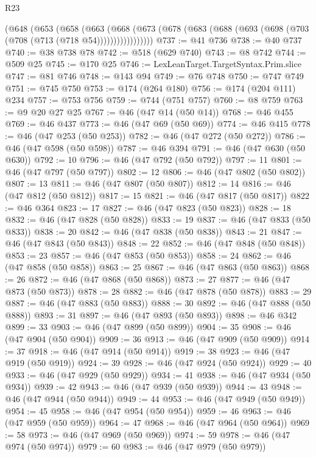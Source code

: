 \begin{lexlean}{R23}
\begin{coremodule}
        (@648
          (@653
            (@658
              (@663
                (@668
                  (@673 (@678 (@683 (@688 (@693 (@698 (@703 (@708 (@713 (@718 @54)))))))))))))))))
@737 := @41 @736
@738 := @40 @737
@740 := @38 @738 @78
@742 := @518 (@629 @740)
@743 := @8 @742
@744 := @509 @25
@745 := @170 @25
@746 := LexLeanTarget.TargetSyntax.Prim.slice
@747 := @81 @746
@748 := @143 @94
@749 := @76 @748
@750 := @747 @749
@751 := @745 @750
@753 := @174 (@264 @180)
@756 := @174 (@204 @111) @234
@757 := @753 @756
@759 := @744 (@751 @757)
@760 := @8 @759
@763 := @9 @20 @27 @25
@767 := @46 (@47 @14 (@50 @14))
@768 := @46 @455
@769 := @46 @437
@773 := @46 (@47 @69 (@50 @69))
@774 := @46 @415
@778 := @46 (@47 @253 (@50 @253))
@782 := @46 (@47 @272 (@50 @272))
@786 := @46 (@47 @598 (@50 @598))
@787 := @46 @394
@791 := @46 (@47 @630 (@50 @630))
@792 := 10
@796 := @46 (@47 @792 (@50 @792))
@797 := 11
@801 := @46 (@47 @797 (@50 @797))
@802 := 12
@806 := @46 (@47 @802 (@50 @802))
@807 := 13
@811 := @46 (@47 @807 (@50 @807))
@812 := 14
@816 := @46 (@47 @812 (@50 @812))
@817 := 15
@821 := @46 (@47 @817 (@50 @817))
@822 := @46 @364
@823 := 17
@827 := @46 (@47 @823 (@50 @823))
@828 := 18
@832 := @46 (@47 @828 (@50 @828))
@833 := 19
@837 := @46 (@47 @833 (@50 @833))
@838 := 20
@842 := @46 (@47 @838 (@50 @838))
@843 := 21
@847 := @46 (@47 @843 (@50 @843))
@848 := 22
@852 := @46 (@47 @848 (@50 @848))
@853 := 23
@857 := @46 (@47 @853 (@50 @853))
@858 := 24
@862 := @46 (@47 @858 (@50 @858))
@863 := 25
@867 := @46 (@47 @863 (@50 @863))
@868 := 26
@872 := @46 (@47 @868 (@50 @868))
@873 := 27
@877 := @46 (@47 @873 (@50 @873))
@878 := 28
@882 := @46 (@47 @878 (@50 @878))
@883 := 29
@887 := @46 (@47 @883 (@50 @883))
@888 := 30
@892 := @46 (@47 @888 (@50 @888))
@893 := 31
@897 := @46 (@47 @893 (@50 @893))
@898 := @46 @342
@899 := 33
@903 := @46 (@47 @899 (@50 @899))
@904 := 35
@908 := @46 (@47 @904 (@50 @904))
@909 := 36
@913 := @46 (@47 @909 (@50 @909))
@914 := 37
@918 := @46 (@47 @914 (@50 @914))
@919 := 38
@923 := @46 (@47 @919 (@50 @919))
@924 := 39
@928 := @46 (@47 @924 (@50 @924))
@929 := 40
@933 := @46 (@47 @929 (@50 @929))
@934 := 41
@938 := @46 (@47 @934 (@50 @934))
@939 := 42
@943 := @46 (@47 @939 (@50 @939))
@944 := 43
@948 := @46 (@47 @944 (@50 @944))
@949 := 44
@953 := @46 (@47 @949 (@50 @949))
@954 := 45
@958 := @46 (@47 @954 (@50 @954))
@959 := 46
@963 := @46 (@47 @959 (@50 @959))
@964 := 47
@968 := @46 (@47 @964 (@50 @964))
@969 := 58
@973 := @46 (@47 @969 (@50 @969))
@974 := 59
@978 := @46 (@47 @974 (@50 @974))
@979 := 60
@983 := @46 (@47 @979 (@50 @979))

\end{coremodule}
\end{lexlean}
